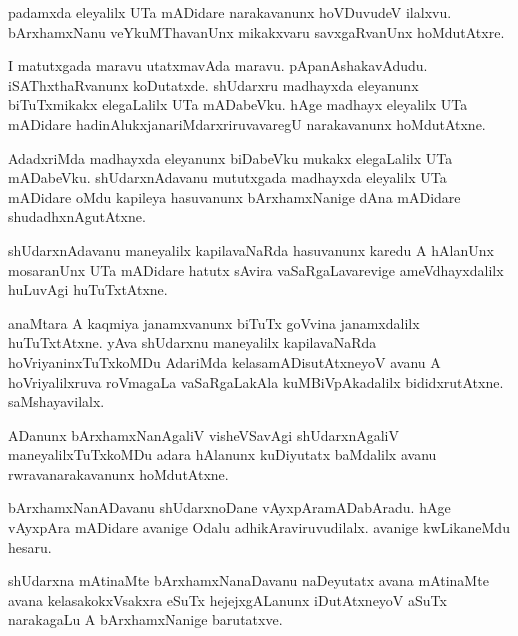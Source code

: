 \documentclass{article}
\begin{document}
\begin{mn}%
padamxda eleyalilx UTa mADidare narakavanunx hoVDuvudeV ilalxvu. bArxhamxNanu veYkuMThavanUnx 
mikakxvaru savxgaRvanUnx hoMdutAtxre.
\end{mn}

\begin{mn}%
I matutxgada maravu utatxmavAda maravu. pApanAshakavAdudu. iSAThxthaRvanunx koDutatxde. shUdarxru 
madhayxda eleyanunx biTuTxmikakx elegaLalilx UTa mADabeVku. hAge madhayx eleyalilx UTa mADidare 
hadinAlukxjanariMdarxriruvavaregU narakavanunx hoMdutAtxne.
\end{mn}

\begin{mn}%
AdadxriMda madhayxda eleyanunx biDabeVku mukakx elegaLalilx UTa mADabeVku. shUdarxnAdavanu 
mututxgada madhayxda eleyalilx UTa mADidare oMdu kapileya hasuvanunx bArxhamxNanige dAna mADidare 
shudadhxnAgutAtxne.
\end{mn}

\begin{mn}%
shUdarxnAdavanu maneyalilx kapilavaNaRda hasuvanunx karedu A hAlanUnx mosaranUnx UTa mADidare hatutx 
sAvira vaSaRgaLavarevige ameVdhayxdalilx huLuvAgi huTuTxtAtxne.
\end{mn}

\begin{mn}%
anaMtara A kaqmiya janamxvanunx biTuTx goVvina janamxdalilx huTuTxtAtxne. yAva shUdarxnu maneyalilx 
kapilavaNaRda hoVriyaninxTuTxkoMDu AdariMda kelasamADisutAtxneyoV avanu A hoVriyalilxruva roVmagaLa 
vaSaRgaLakAla kuMBiVpAkadalilx bididxrutAtxne. saMshayavilalx.
\end{mn}

\begin{mn}%
ADanunx bArxhamxNanAgaliV visheVSavAgi shUdarxnAgaliV maneyalilxTuTxkoMDu adara hAlanunx kuDiyutatx 
baMdalilx avanu rwravanarakavanunx hoMdutAtxne.
\end{mn}

\begin{mn}%
bArxhamxNanADavanu shUdarxnoDane vAyxpAramADabAradu. hAge vAyxpAra mADidare avanige Odalu 
adhikAraviruvudilalx. avanige kwLikaneMdu hesaru.
\end{mn}

\begin{mn}%
shUdarxna mAtinaMte bArxhamxNanaDavanu naDeyutatx avana mAtinaMte avana kelasakokxVsakxra eSuTx 
hejejxgALanunx iDutAtxneyoV aSuTx narakagaLu A bArxhamxNanige barutatxve.
\end{mn}
\end{document}
